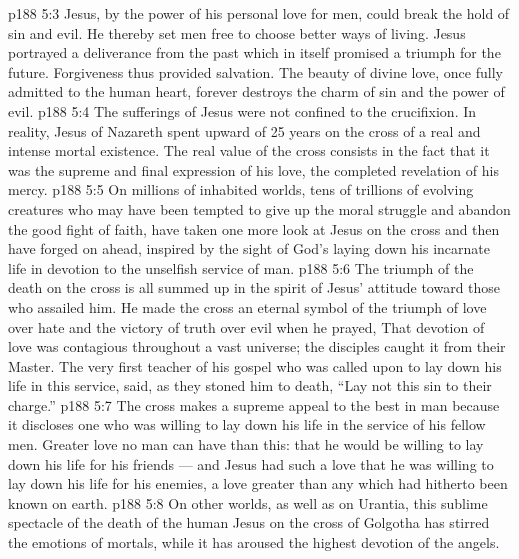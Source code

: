\vs p188 5:3 Jesus, by the power of his personal love for men, could break the hold of sin and evil. He thereby set men free to choose better ways of living. Jesus portrayed a deliverance from the past which in itself promised a triumph for the future. Forgiveness thus provided salvation. The beauty of divine love, once fully admitted to the human heart, forever destroys the charm of sin and the power of evil.
\vs p188 5:4 \pc The sufferings of Jesus were not confined to the crucifixion. In reality, Jesus of Nazareth spent upward of 25 years on the cross of a real and intense mortal existence. The real value of the cross consists in the fact that it was the supreme and final expression of his love, the completed revelation of his mercy.
\vs p188 5:5 \pc On millions of inhabited worlds, tens of trillions of evolving creatures who may have been tempted to give up the moral struggle and abandon the good fight of faith, have taken one more look at Jesus on the cross and then have forged on ahead, inspired by the sight of God’s laying down his incarnate life in devotion to the unselfish service of man.
\vs p188 5:6 The triumph of the death on the cross is all summed up in the spirit of Jesus’ attitude toward those who assailed him. He made the cross an eternal symbol of the triumph of love over hate and the victory of truth over evil when he prayed,  That devotion of love was contagious throughout a vast universe; the disciples caught it from their Master. The very first teacher of his gospel who was called upon to lay down his life in this service, said, as they stoned him to death, “Lay not this sin to their charge.”
\vs p188 5:7 The cross makes a supreme appeal to the best in man because it discloses one who was willing to lay down his life in the service of his fellow men. Greater love no man can have than this: that he would be willing to lay down his life for his friends --- and Jesus had such a love that he was willing to lay down his life for his enemies, a love greater than any which had hitherto been known on earth.
\vs p188 5:8 On other worlds, as well as on Urantia, this sublime spectacle of the death of the human Jesus on the cross of Golgotha has stirred the emotions of mortals, while it has aroused the highest devotion of the angels.
